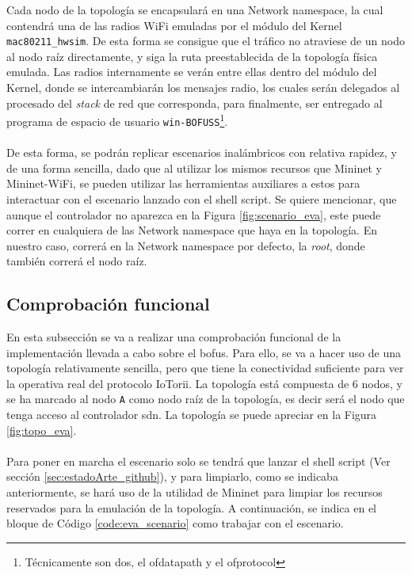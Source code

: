 Cada nodo de la topología se encapsulará en una Network namespace, la cual contendrá una de las radios WiFi emuladas por el módulo del Kernel \texttt{mac80211\_hwsim}. De esta forma se consigue que el tráfico no atraviese de un nodo al nodo raíz directamente, y siga la ruta preestablecida de la topología física emulada. Las radios internamente se verán entre ellas dentro del módulo del Kernel, donde se intercambiarán los mensajes radio, los cuales serán delegados al procesado del \textit{stack} de red que corresponda, para finalmente, ser entregado al programa de espacio de usuario \texttt{win-BOFUSS}\footnote{Técnicamente son dos, el ofdatapath y el ofprotocol}.\\
\\
De esta forma, se podrán replicar escenarios inalámbricos con relativa rapidez, y de una forma sencilla, dado que al utilizar los mismos recursos que Mininet y Mininet-WiFi, se pueden utilizar las herramientas auxiliares a estos para interactuar con el escenario lanzado con el shell script. Se quiere mencionar, que aunque el controlador no aparezca en la Figura \ref{fig:scenario_eva}, este puede correr en cualquiera de las Network namespace que haya en la topología. En nuestro caso, correrá en la Network namespace por defecto, la \textit{root}, donde también correrá el nodo raíz.

\subsection{Comprobación funcional}

En esta subsección se va a realizar una comprobación funcional de la implementación llevada a cabo sobre el \gls{bofus}. Para ello, se va a hacer uso de una topología relativamente sencilla, pero que tiene la conectividad suficiente para ver la operativa real del protocolo IoTorii. La topología está compuesta de 6 nodos, y se ha marcado al nodo \texttt{A} como nodo raíz de la topología, es decir será el nodo que tenga acceso al controlador \gls{sdn}. La topología se puede apreciar en la Figura \ref{fig:topo_eva}.\\
\\
Para poner en marcha el escenario solo se tendrá que lanzar el shell script (Ver sección \ref{sec:estadoArte_github}), y para limpiarlo, como se indicaba anteriormente, se hará uso de la utilidad de Mininet para limpiar los recursos reservados para la emulación de la topología. A continuación, se indica en el bloque de Código \ref{code:eva_scenario} como trabajar con el escenario.

